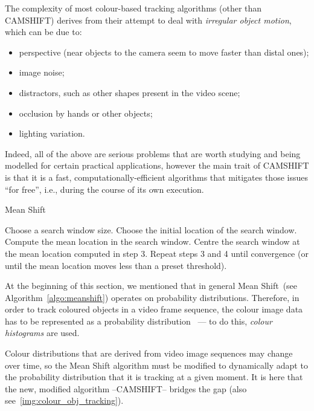The complexity of most colour-based tracking algorithms (other than \ac{CAMSHIFT}) derives from their attempt to deal with \emph{irregular object motion}, which can be due to:
\begin{itemize}
\item perspective (near objects to the camera seem to move faster than distal ones);

\item image noise;

\item distractors, such as other shapes present in the video scene;

\item occlusion by hands or other objects;

\item lighting variation.
\end{itemize}

Indeed, all of the above are serious problems that are worth studying and being modelled for certain practical applications, however the main trait of \ac{CAMSHIFT} is that it is a fast, computationally-efficient algorithms that mitigates those issues ``for free'', i.e., during the course of its own execution.

\bigskip

\begin{algorithm}
\caption{Mean Shift}
\label{algo:meanshift} 
\begin{algorithmic}[1]
\STATE Choose a search window size.
\STATE Choose the initial location of the search window.
\STATE Compute the mean location in the search window.
\STATE Centre the search window at the mean location computed in step 3.
\STATE Repeat steps 3 and 4 until convergence (or until the mean location moves less than a preset threshold).
\end{algorithmic}
\end{algorithm}

At the beginning of this section, we mentioned that in general Mean Shift~(see Algorithm~\ref{algo:meanshift}) operates on probability distributions. Therefore, in order to track coloured objects in a video frame sequence, the colour image data has to be represented as a probability distribution~\cite{comaniciu:1997} --- to do this, \emph{colour histograms} are used.

Colour distributions that are derived from video image sequences may change over time, so the Mean Shift algorithm must be modified to dynamically adapt to the probability distribution that it is tracking at a given moment. It is here that the new, modified algorithm --\ac{CAMSHIFT}-- bridges the gap (also see~\ref{img:colour_obj_tracking}).

